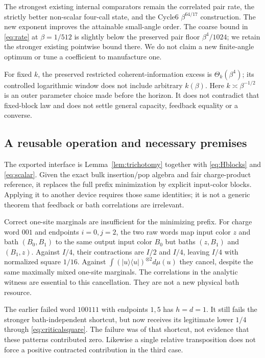\documentclass[11pt]{article}
\newcommand{\ket}[1]{\lvert #1\rangle}
\newcommand{\bra}[1]{\langle #1\rvert}
\begin{document}
The strongest existing internal comparators remain the correlated pair
rate, the strictly better non-scalar four-call state, and the Cycle6
$\beta^{64/17}$ construction. The new exponent improves the attainable
small-angle order. The coarse bound in \eqref{eq:rate} at $\beta=1/512$
is slightly below the preserved pair floor $\beta^4/1024$; we retain the
stronger existing pointwise bound there. We do not claim a new finite-angle
optimum or tune a coefficient to manufacture one.

For fixed $k$, the preserved restricted coherent-information excess is
$\Theta_k(\beta^4)$; its controlled logarithmic window does not include
arbitrary $k(\beta)$. Here $k\asymp\beta^{-1/2}$ is an outer parameter
choice made before the horizon. It does not contradict that fixed-block
law and does not settle general capacity, feedback equality or a converse.

\subsection{A reusable operation and necessary premises}

The exported interface is Lemma~\ref{lem:trichotomy} together with
\eqref{eq:Hblocks} and \eqref{eq:scalar}. Given the exact bulk
insertion/pop algebra and fair charge-product reference, it replaces
the full prefix minimization by explicit input-color blocks. Applying it
to another device requires those same identities; it is not a generic
theorem that feedback or bath correlations are irrelevant.

Correct one-site marginals are insufficient for the minimizing prefix.
For charge word $001$ and endpoints $i=0,j=2$, the two raw words map
input color $z$ and bath $(B_0,B_1)$ to the same output input color $B_0$
but baths $(z,B_1)$ and $(B_1,z)$. Against $I/4$, their contractions
are $I/2$ and $I/4$, leaving $I/4$ with normalized square $1/16$.
Against $\int(\ket u\bra u)^{\otimes2}d\mu(u)$ they cancel, despite
the same maximally mixed one-site marginals. The correlations in the
analytic witness are essential to this cancellation. They are not a
new physical bath resource.

The earlier failed word $100111$ with endpoints $1,5$ has $h=d=1$.
It still fails the stronger bath-independent shortcut, but now receives
its legitimate lower $1/4$ through \eqref{eq:criticalsquare}. The failure
was of that shortcut, not evidence that these patterns contributed zero.
Likewise a single relative transposition does not force a positive
contracted contribution in the third case.
\end{document}
